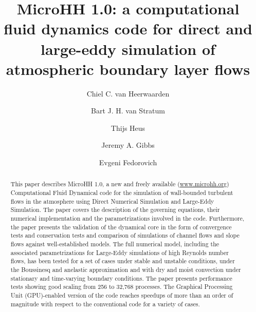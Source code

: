 \documentclass[gmd]{copernicus}
\begin{document}
\linenumbers

\title{MicroHH 1.0: a computational fluid dynamics code for direct and large-eddy simulation of atmospheric boundary layer flows}


\author[1,2]{Chiel C. van Heerwaarden}
\author[1]{Bart J. H. van Stratum}
\author[3]{Thijs Heus}
\author[4]{Jeremy A. Gibbs}
\author[4]{Evgeni Fedorovich}










\received{}
\pubdiscuss{} %
\revised{}
\accepted{}
\published{}




\maketitle  %

\begin{abstract}
This paper describes MicroHH 1.0, a new and freely available (\url{www.microhh.org}) Computational Fluid Dynamical code for the simulation of wall-bounded turbulent flows in the atmosphere using Direct Numerical Simulation and Large-Eddy Simulation. The paper covers the description of the governing equations, their numerical implementation and the parametrizations involved in the code. Furthermore, the paper presents the validation of the dynamical core in the form of convergence tests and conservation tests and comparison of simulations of channel flows and slope flows against well-established models. The full numerical model, including the associated parametrizations for Large-Eddy simulations of high Reynolds number flows, has been tested for a set of cases under stable and unstable conditions, under the Boussinesq and anelastic approximation and with dry and moist convection under stationary and time-varying boundary conditions. The paper presents performance tests showing good scaling from 256 to 32,768 processes. The Graphical Processing Unit (GPU)-enabled version of the code reaches speedups of more than an order of magnitude with respect to the conventional code for a variety of cases.
\end{abstract}
\end{document}
